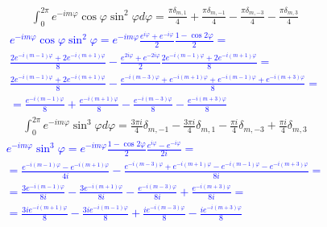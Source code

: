 %
\begin{equation} \begin{aligned} \label{eq:int_exp3}
\int_0^{2\pi} e^{-i m \varphi} \cos \varphi \sin^2 \varphi d \varphi = 
\frac{\pi \delta_{m,1} }{4} + \frac{\pi \delta_{m,-1} }{4} - 
\frac{\pi \delta_{m,-3} }{4} - \frac{\pi \delta_{m,3} }{4}
\end{aligned} \end{equation}
%
\textcolor{blue}{ \begin{equation*} \begin{aligned}
e^{-i m \varphi} \cos \varphi \sin^2 \varphi = e^{-i m \varphi} 
\frac{e^{i\varphi} + e^{-i\varphi}}{2} \frac{1 - \cos 2\varphi}{2} = \\
\frac{2e^{-i(m-1)\varphi} + 2e^{-i(m+1)\varphi}}{8} - 
\frac{e^{2i\varphi} + e^{-2i\varphi}}{2} 
\frac{2e^{-i(m-1)\varphi} + 2e^{-i(m+1)\varphi}}{8} = \\
\frac{2e^{-i(m-1)\varphi} + 2e^{-i(m+1)\varphi}}{8} - 
\frac{e^{-i(m-3)\varphi} + e^{-i(m+1)\varphi} + 
e^{-i(m-1)\varphi} + e^{-i(m+3)\varphi}}{8} = \\
= \frac{e^{-i(m-1)\varphi}}{8} + \frac{e^{-i(m+1)\varphi}}{8} -
\frac{e^{-i(m-3)\varphi}}{8} - \frac{e^{-i(m+3)\varphi}}{8}
\end{aligned} \end{equation*} }
%
\begin{equation} \begin{aligned} \label{eq:int_exp4}
\int_{0}^{2\pi} e^{-i m \varphi} \sin^3 \varphi d \varphi = 
\frac{3 \pi i}{4} \delta_{m,-1} - \frac{3 \pi i}{4} \delta_{m,1} - 
\frac{\pi i}{4} \delta_{m,-3} + \frac{\pi i}{4} \delta_{m,3}
\end{aligned} \end{equation}
%
\textcolor{blue}{ \begin{equation*} \begin{aligned}
e^{-i m \varphi} \sin^3 \varphi = e^{-i m \varphi} 
\frac{1 - \cos 2\varphi}{2} \frac{e^{i\varphi} - e^{-i\varphi}}{2i} = \\
= \frac{e^{-i(m-1)\varphi} - e^{-i(m+1)\varphi}}{4i} - 
\frac{e^{-i(m-3)\varphi} + e^{-i(m+1)\varphi} -
e^{-i(m-1)\varphi} - e^{-i(m+3)\varphi}}{8i} = \\
= \frac{3 e^{-i(m-1)\varphi}}{8i} - \frac{3 e^{-i(m+1)\varphi}}{8i} - 
\frac{e^{-i(m-3)\varphi}}{8i} + \frac{e^{-i(m+3)\varphi}}{8i} = \\
= \frac{3i e^{-i(m+1)\varphi}}{8} - \frac{3i e^{-i(m-1)\varphi}}{8} + 
\frac{i e^{-i(m-3)\varphi}}{8} - \frac{i e^{-i(m+3)\varphi}}{8} 
\end{aligned} \end{equation*} }
